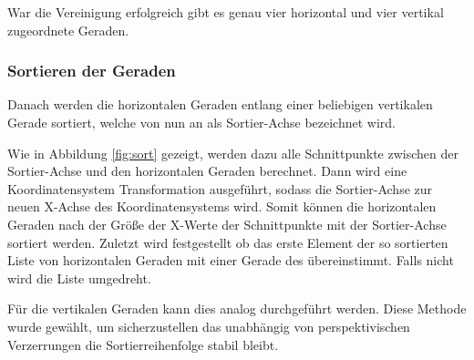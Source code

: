 War die Vereinigung erfolgreich gibt es genau vier horizontal und vier vertikal zugeordnete Geraden.

\subsubsection{Sortieren der Geraden}
Danach werden die horizontalen Geraden entlang einer beliebigen vertikalen Gerade sortiert, welche von nun an als Sortier-Achse bezeichnet wird. 

Wie in Abbildung \ref{fig:sort} gezeigt, werden dazu alle Schnittpunkte zwischen der Sortier-Achse und den horizontalen Geraden berechnet. Dann wird eine Koordinatensystem Transformation ausgeführt, sodass die Sortier-Achse zur neuen X-Achse des Koordinatensystems wird. Somit können die horizontalen Geraden nach der Größe der X-Werte der Schnittpunkte mit der Sortier-Achse sortiert werden. Zuletzt wird festgestellt ob das erste Element der so sortierten Liste von horizontalen Geraden mit einer Gerade des \olfp übereinstimmt. Falls nicht wird die Liste umgedreht.

Für die vertikalen Geraden kann dies analog durchgeführt werden. Diese Methode wurde gewählt, um sicherzustellen das unabhängig von perspektivischen Verzerrungen die Sortierreihenfolge stabil bleibt.

